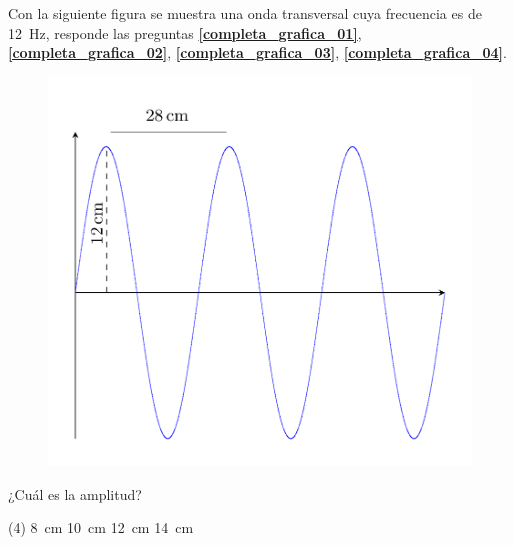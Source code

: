 \documentclass[12pt, letter]{exam}
\begin{document}
\begin{questions}
{}
    Con la siguiente figura se muestra una onda transversal cuya frecuencia es de \SI{12}{\hertz}, responde las preguntas \textbf{\ref{completa_grafica_01}}, \textbf{\ref{completa_grafica_02}}, \textbf{\ref{completa_grafica_03}}, \textbf{\ref{completa_grafica_04}}.
    \begin{figure}[H]
        \centering
        \includegraphics[scale=0.3]{Imagenes/Grafica_Onda_Examen_01.png}
    \end{figure}
    \question \label{completa_grafica_01} ¿Cuál es la amplitud?
    \begin{tasks}(4)
        \task \SI{8}{\centi\meter}
        \task \SI{10}{\centi\meter}
        \task \SI{12}{\centi\meter}
        \task \SI{14}{\centi\meter}
    \end{tasks}

\end{questions}
\end{document}

